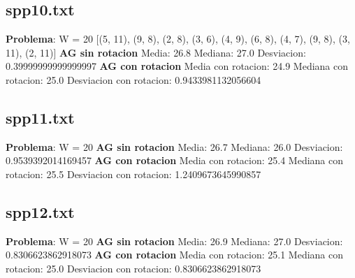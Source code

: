 \documentclass[10pt]{article}
\begin{document}
\subsection*{spp10.txt}
\noindent \textbf{Problema}: W = 20 [(5, 11), (9, 8), (2, 8), (3, 6), (4, 9), (6, 8), (4, 7), (9, 8), (3, 11), (2, 11)]\newline
\newline
\textbf{AG sin rotacion}\newline
Media: 26.8\newline
Mediana: 27.0\newline
Desviacion: 0.39999999999999997\newline
\newline
\textbf{AG con rotacion}\newline
Media con rotacion: 24.9\newline
Mediana con rotacion: 25.0\newline
Desviacion con rotacion: 0.9433981132056604
\subsection*{spp11.txt}
\noindent \textbf{Problema}: W = 20 \newline
[(4, 13), (7, 8), (10, 5), (2, 8), (6, 7), (3, 8), (1, 12), (4, 7), (4, 4), (6, 12), (4, 8)]\newline
\newline
\textbf{AG sin rotacion}\newline
Media: 26.7\newline
Mediana: 26.0\newline
Desviacion: 0.9539392014169457
\newline
\textbf{AG con rotacion}\newline
Media con rotacion: 25.4\newline
Mediana con rotacion: 25.5\newline
Desviacion con rotacion: 1.2409673645990857
\subsection*{spp12.txt}
\noindent \textbf{Problema}: W = 20 \newline
[(3, 6), (5, 8), (4, 5), (10, 8), (7, 4), (6, 3), (8, 8), (4, 6), (18, 3), (2, 3), (3, 10), (9, 2)]\newline
\newline
\textbf{AG sin rotacion}\newline 
Media: 26.9\newline
Mediana: 27.0\newline
Desviacion: 0.8306623862918073\newline
\newline
\textbf{AG con rotacion}\newline
Media con rotacion: 25.1\newline
Mediana con rotacion: 25.0\newline
Desviacion con rotacion: 0.8306623862918073
\end{document}
